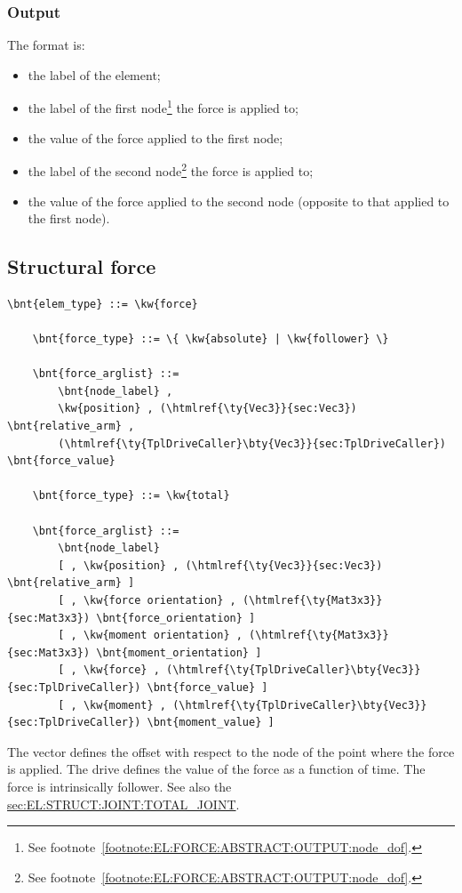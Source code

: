 \subsubsection{Output}
The format is:
\begin{itemize}
    \item the label of the element;
    \item the label of the first node\footnote{See
	footnote~\ref{footnote:EL:FORCE:ABSTRACT:OUTPUT:node_dof}.}
	the force is applied to;
    \item the value of the force applied to the first node;
    \item the label of the second node\footnote{See
	footnote~\ref{footnote:EL:FORCE:ABSTRACT:OUTPUT:node_dof}.}
	the force is applied to;
    \item the value of the force applied to the second node
	  (opposite to that applied to the first node).
\end{itemize}

\subsection{Structural force}
\label{sec:EL:FORCE:STRUCTURAL:FORCE}
\begin{Verbatim}[commandchars=\\\{\}]
    \bnt{elem_type} ::= \kw{force}

    \bnt{force_type} ::= \{ \kw{absolute} | \kw{follower} \} 

    \bnt{force_arglist} ::=
        \bnt{node_label} , 
        \kw{position} , (\htmlref{\ty{Vec3}}{sec:Vec3}) \bnt{relative_arm} ,
        (\htmlref{\ty{TplDriveCaller}\bty{Vec3}}{sec:TplDriveCaller}) \bnt{force_value}

    \bnt{force_type} ::= \kw{total}

    \bnt{force_arglist} ::=
        \bnt{node_label}
        [ , \kw{position} , (\htmlref{\ty{Vec3}}{sec:Vec3}) \bnt{relative_arm} ]
        [ , \kw{force orientation} , (\htmlref{\ty{Mat3x3}}{sec:Mat3x3}) \bnt{force_orientation} ]
        [ , \kw{moment orientation} , (\htmlref{\ty{Mat3x3}}{sec:Mat3x3}) \bnt{moment_orientation} ]
        [ , \kw{force} , (\htmlref{\ty{TplDriveCaller}\bty{Vec3}}{sec:TplDriveCaller}) \bnt{force_value} ]
        [ , \kw{moment} , (\htmlref{\ty{TplDriveCaller}\bty{Vec3}}{sec:TplDriveCaller}) \bnt{moment_value} ]
\end{Verbatim}
The vector  defines the offset with respect
to the node of the point where the force is applied.
The drive  defines the value of the force
as a function of time.
The  force is intrinsically follower.
See also the 
\hyperref{\kw{total joint}}{\kw{total joint} (Section~}{)}{sec:EL:STRUCT:JOINT:TOTAL_JOINT}.

